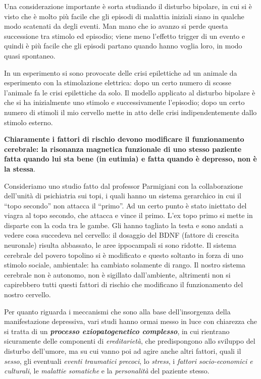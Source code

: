 Una considerazione importante è sorta studiando il disturbo bipolare, in
cui si è visto che è molto più facile che gli episodi di malattia
iniziali siano in qualche modo scatenati da degli eventi. Man mano che
io avanzo si perde questa successione tra stimolo ed episodio; viene
meno l'effetto trigger di un evento e quindi è più facile che gli
episodi partano quando hanno voglia loro, in modo quasi spontaneo.

In un esperimento si sono provocate delle crisi epilettiche ad un
animale da esperimento con la stimolazione elettrica: dopo un certo
numero di scosse l'animale fa le crisi epilettiche da solo. Il modello
applicato al disturbo bipolare è che si ha inizialmente uno stimolo e
successivamente l'episodio; dopo un certo numero di stimoli il mio
cervello mette in atto delle crisi indipendentemente dallo stimolo
esterno.

\textbf{Chiaramente i fattori di rischio devono modificare il
funzionamento cerebrale: la risonanza magnetica funzionale di uno stesso
paziente fatta quando lui sta bene (in eutimia) e fatta quando è
depresso, non è la stessa}.

Consideriamo uno studio fatto dal professor Parmigiani con la
collaborazione dell'unità di psichiatria sui topi, i quali hanno un
sistema gerarchico in cui il ``topo secondo'' non attacca il ``primo''.
Ad un certo punto è stato iniettato del viagra al topo secondo, che
attacca e vince il primo. L'ex topo primo si mette in disparte con la
coda tra le gambe. Gli hanno tagliato la testa e sono andati a vedere
cosa succedeva nel cervello: il dosaggio del BDNF (fattore di crescita
neuronale) risulta abbassato, le aree ippocampali si sono ridotte. Il
sistema cerebrale del povero topolino si è modificato e questo soltanto
in forza di uno stimolo sociale, ambientale: ha cambiato solamente di
rango. Il nostro sistema cerebrale non è autonomo, non è sigillato
dall'ambiente, altrimenti non si capirebbero tutti questi fattori di
rischio che modificano il funzionamento del nostro cervello.

Per quanto riguarda i meccanismi che sono alla base dell'insorgenza
della manifestazione depressiva, vari studi hanno ormai messo in luce
con chiarezza che si tratta di un \textbf{\emph{processo
eziopatogenetico complesso}}, in cui rientrano sicuramente delle
componenti di \emph{ereditarietà}, che predispongono allo sviluppo del
disturbo dell'umore, ma su cui vanno poi ad agire anche altri fattori,
quali il \emph{sesso}, gli eventuali \emph{eventi traumatici precoci},
lo \emph{stress}, i \emph{fattori socio-economici e culturali}, le
\emph{malattie somatiche} e la \emph{personalità} del paziente stesso.

